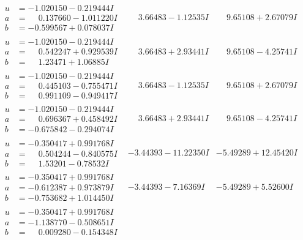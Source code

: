 \documentclass[1p]{elsarticle_modified}
\theoremstyle{definition}
\begin{document}
$$\begin{array}{c|c|c}
\begin{aligned}
u &= -1.020150 - 0.219444 I \\
a &= \phantom{-}0.137660 - 1.011220 I \\
b &= -0.599567 + 0.078037 I\end{aligned}
 & \phantom{-}3.66483 - 1.12535 I & \phantom{-}9.65108 + 2.67079 I \\ \hline\begin{aligned}
u &= -1.020150 - 0.219444 I \\
a &= \phantom{-}0.542247 + 0.929539 I \\
b &= \phantom{-}1.23471 + 1.06885 I\end{aligned}
 & \phantom{-}3.66483 + 2.93441 I & \phantom{-}9.65108 - 4.25741 I \\ \hline\begin{aligned}
u &= -1.020150 - 0.219444 I \\
a &= \phantom{-}0.445103 - 0.755471 I \\
b &= \phantom{-}0.991109 - 0.949417 I\end{aligned}
 & \phantom{-}3.66483 - 1.12535 I & \phantom{-}9.65108 + 2.67079 I \\ \hline\begin{aligned}
u &= -1.020150 - 0.219444 I \\
a &= \phantom{-}0.696367 + 0.458492 I \\
b &= -0.675842 - 0.294074 I\end{aligned}
 & \phantom{-}3.66483 + 2.93441 I & \phantom{-}9.65108 - 4.25741 I \\ \hline\begin{aligned}
u &= -0.350417 + 0.991768 I \\
a &= \phantom{-}0.504244 - 0.840575 I \\
b &= \phantom{-}1.53201 - 0.78532 I\end{aligned}
 & -3.44393 - 11.22350 I & -5.49289 + 12.45420 I \\ \hline\begin{aligned}
u &= -0.350417 + 0.991768 I \\
a &= -0.612387 + 0.973879 I \\
b &= -0.753682 + 1.014450 I\end{aligned}
 & -3.44393 - 7.16369 I & -5.49289 + 5.52600 I \\ \hline\begin{aligned}
u &= -0.350417 + 0.991768 I \\
a &= -1.138770 - 0.508651 I \\
b &= \phantom{-}0.009280 - 0.154348 I\end{aligned}

\end{array}$$
\end{document}
